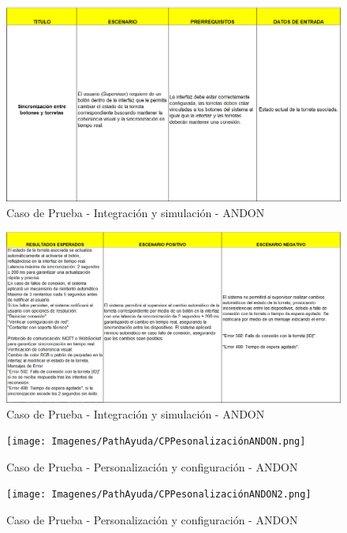 \documentclass[12pt,letterpaper,spanish, xcolor=table]{report}
\numberwithin{figure}{subsection}
\begin{document}
	\begin{figure}[H]
		\centering
		\includegraphics[width=1.0\textwidth]
		{Imagenes/PathAyuda/CPANDON.png}
		\caption{Caso de Prueba - Integración y simulación - ANDON
		}\label{a2}
	\end{figure}
	
	\begin{figure}[H]
		\centering
		\includegraphics[width=1.0\textwidth]
		{Imagenes/PathAyuda/CPANDON2.png}
		\caption{Caso de Prueba - Integración y simulación - ANDON
		}\label{a2}
	\end{figure}
	
	\begin{figure}[H]
		\centering
		\texttt{[image: Imagenes/PathAyuda/CPPesonalizaciónANDON.png]}
		\caption{Caso de Prueba - Personalización y configuración - ANDON 
		}\label{a2}
	\end{figure}
	
	\begin{figure}[H]
		\centering
		\texttt{[image: Imagenes/PathAyuda/CPPesonalizaciónANDON2.png]}
		\caption{Caso de Prueba - Personalización y configuración - ANDON
		}\label{a2}
	\end{figure}
	
\end{document}

